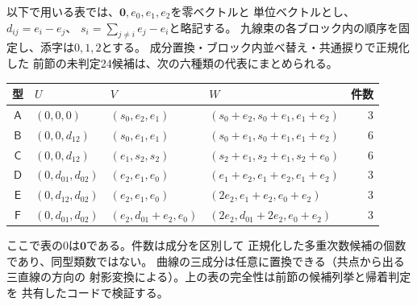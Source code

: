 以下で用いる表では、$\mathbf0,e_0,e_1,e_2$を零ベクトルと
単位ベクトルとし、$d_{ij}=e_i-e_j$、
$s_i=\sum_{j\ne i}e_j-e_i$と略記する。
九線束の各ブロック内の順序を固定し、添字は$0,1,2$とする。
成分置換・ブロック内並べ替え・共通捩りで正規化した
前節の未判定24候補は、次の六種類の代表にまとめられる。
\begin{center}
\small
\begin{tabular}{clllr}
\toprule
型 & $U$ & $V$ & $W$ & 件数\\
\midrule
$\mathsf A$ & $(0,0,0)$ & $(s_0,e_2,e_1)$ &
 $(s_0+e_2,s_0+e_1,e_1+e_2)$ &3\\
$\mathsf B$ & $(0,0,d_{12})$ & $(s_0,e_1,e_1)$ &
 $(s_0+e_1,s_0+e_1,e_1+e_2)$ &6\\
$\mathsf C$ & $(0,0,d_{12})$ & $(e_1,s_2,s_2)$ &
 $(s_2+e_1,s_2+e_1,s_2+e_0)$ &6\\
$\mathsf D$ & $(0,d_{01},d_{02})$ & $(e_2,e_1,e_0)$ &
 $(e_1+e_2,e_1+e_2,e_1+e_2)$ &3\\
$\mathsf E$ & $(0,d_{12},d_{02})$ & $(e_2,e_1,e_0)$ &
 $(2e_2,e_1+e_2,e_0+e_2)$ &3\\
$\mathsf F$ & $(0,d_{01},d_{02})$ & $(e_2,d_{01}+e_2,e_0)$ &
 $(2e_2,d_{01}+2e_2,e_0+e_2)$ &3\\
\bottomrule
\end{tabular}
\end{center}
ここで表の$0$は$\mathbf0$である。件数は成分を区別して
正規化した多重次数候補の個数であり、同型類数ではない。
曲線の三成分は任意に置換できる（共点から出る三直線の方向の
射影変換による）。上の表の完全性は前節の候補列挙と帰着判定を
共有したコードで検証する。


